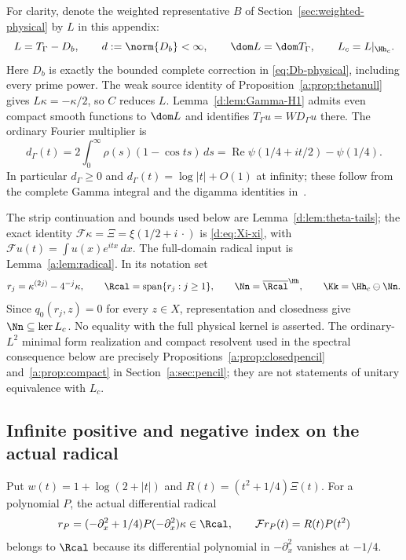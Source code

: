For clarity, denote the weighted representative $B$ of
Section~\ref{sec:weighted-physical} by $L$ in this appendix:
\begin{equation}\label{vfourA:eq:actual-operator}
 L=T_\Gamma-D_b,\qquad d:=\norm{D_b}<\infty,\qquad
 \dom L=\dom T_\Gamma,\qquad L_c=L|_{\Hh_c}.
\end{equation}
Here $D_b$ is exactly the bounded complete correction in
\eqref{eq:Db-physical}, including every prime power.  The weak source
identity of Proposition~\ref{a:prop:thetanull} gives
$L\kappa=-\kappa/2$, so $C$ reduces $L$.  Lemma~\ref{d:lem:Gamma-H1}
admits even compact smooth functions to $\dom L$ and identifies
$T_\Gamma u=WD_\Gamma u$ there.  The ordinary Fourier multiplier is
\begin{equation}\label{vfourA:eq:symbol}
 d_\Gamma(t)=2\int_0^\infty\rho(s)(1-\cos ts)\,ds
 =\operatorname{Re}\psi(1/4+it/2)-\psi(1/4).
\end{equation}
In particular $d_\Gamma\ge0$ and
$d_\Gamma(t)=\log|t|+O(1)$ at infinity; these follow from the complete
Gamma integral and the digamma identities in~\cite[Sections 5.9 and 5.11]{DLMF}.

The strip continuation and bounds used below are
Lemma~\ref{d:lem:theta-tails}; the exact identity
$\mathcal F\kappa=\Xi=\xi(1/2+i\,\cdot)$ is
\eqref{d:eq:Xi-xi}, with
$\mathcal Fu(t)=\int u(x)e^{itx}\,dx$.  The full-domain radical input is
Lemma~\ref{a:lem:radical}.  In its notation set
\begin{equation}\label{vfourA:eq:radical-spaces}
 r_j=\kappa^{(2j)}-4^{-j}\kappa,\qquad
 \Rcal=\operatorname{span}\{r_j:j\ge1\},\qquad
 \Nn=\overline{\Rcal}^{\Hh},\qquad \Kk=\Hh_c\ominus\Nn.
\end{equation}
Since $q_0(r_j,z)=0$ for every $z\in X$, representation and closedness
give $\Nn\subseteq\ker L_c$.  No equality with the full physical kernel
is asserted.  The ordinary-$L^2$ minimal form realization and compact
resolvent used in the spectral consequence below are precisely
Propositions~\ref{a:prop:closedpencil} and~\ref{a:prop:compact} in
Section~\ref{a:sec:pencil}; they are not statements of unitary equivalence
with $L_c$.

\subsection{Infinite positive and negative index on the actual radical}
\label{vfourA:subsec:index}

Put $w(t)=1+\log(2+|t|)$ and $R(t)=(t^2+1/4)\Xi(t)$.  For a polynomial
$P$, the actual differential radical
\begin{equation}\label{vfourA:eq:polynomial-radical}
 r_P=(-\partial_x^2+1/4)P(-\partial_x^2)\kappa\in\Rcal,
 \qquad \mathcal F r_P(t)=R(t)P(t^2)
\end{equation}
belongs to $\Rcal$ because its differential polynomial in
$-\partial_x^2$ vanishes at $-1/4$.

